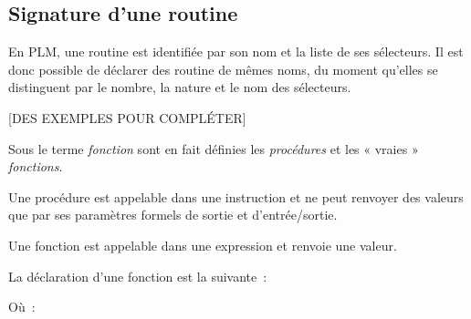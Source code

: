\subsection{Signature d'une routine}

En PLM, une routine est identifiée par son nom et la liste de ses sélecteurs. Il est donc possible de déclarer des routine de mêmes noms, du moment qu'elles se distinguent par le nombre, la nature et le nom des sélecteurs.

[DES EXEMPLES POUR COMPLÉTER] 














 



















Sous le terme \emph{fonction} sont en fait définies les \emph{procédures} et les « vraies » \emph{fonctions}.

Une procédure est appelable dans une instruction et ne peut renvoyer des valeurs que par ses paramètres formels de sortie et d'entrée/sortie.

Une fonction est appelable dans une expression et renvoie une valeur.






La déclaration d'une fonction est la suivante~:
Où~:


